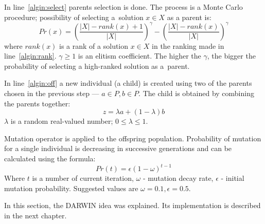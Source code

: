 In line~\ref{algin:select} parents selection is done. The process is a Monte
Carlo procedure; possibility of selecting a~solution $x \in X$ as a parent
is:\\
$$Pr(x) = \left( \frac{|X|-\textit{rank}(x) + 1}{|X|} \right)^\gamma - \left(
\frac{|X|-\textit{rank}(x)}{|X|} \right)^\gamma$$ where $\textit{rank}(x)$ is
a rank of a solution $x \in X$ in the ranking made in
line~\ref{algin:rank}. $\gamma \geq 1$ is an elitism coefficient. The higher
the $\gamma$, the bigger the probability of selecting a high-ranked solution
as a~parent.

In line~\ref{algin:off} a new individual (a child) is created using two of the
parents chosen in the previous step --- $a \in P, b \in P$. The child is
obtained by combining the parents together: $$z = \lambda a + (1 - \lambda)
b$$ $\lambda$ is a random real-valued number; $0 \leq \lambda \leq 1$.


Mutation operator is applied to the offspring population. Probability of
mutation for a single individual is decreasing in successive generations and
can be calculated using the formula: $$Pr(t) = \epsilon (1 - \omega)^{t-1}$$
Where $t$ is a number of current iteration, $\omega$ - mutation decay rate,
$\epsilon$ - initial mutation probability. Suggested values are
$\omega = 0.1, \epsilon = 0.5$.

In this section, the DARWIN idea was explained. Its implementation is
described in the next chapter.

